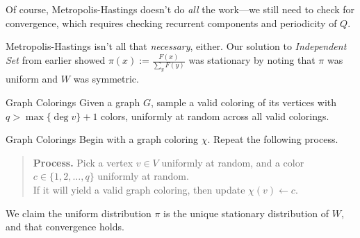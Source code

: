 Of course, Metropolis-Hastings doesn't do \emph{all} the work---we still need to check for convergence, which requires checking recurrent components and periodicity of $Q$.

\begin{remark}
    Metropolis-Hastings isn't all that \emph{necessary}, either.  Our solution to \emph{Independent Set} from earlier showed $\pi(x) := \frac{F(x)}{\sum_y F(y)}$ was stationary by noting that $\pi$ was uniform and $W$ was symmetric.
\end{remark}

\begin{problem}{Graph Colorings}
    Given a graph $G$, sample a valid coloring of its vertices with $q > \max\{\deg v\} + 1$ colors, uniformly at random across all valid colorings.
\end{problem}

\begin{solution}{Graph Colorings}
    Begin with a graph coloring $\chi$.  Repeat the following process.
    \begin{quote}
        \textbf{Process.} Pick a vertex $v \in V$ uniformly at random, and a color $c \in \{1, 2, \dots, q\}$ uniformly at random. \\ If it will yield a valid graph coloring, then update $\chi(v) \leftarrow c$.
    \end{quote}
    We claim the uniform distribution $\pi$ is the unique stationary distribution of $W$, and that convergence holds.
\end{solution}


